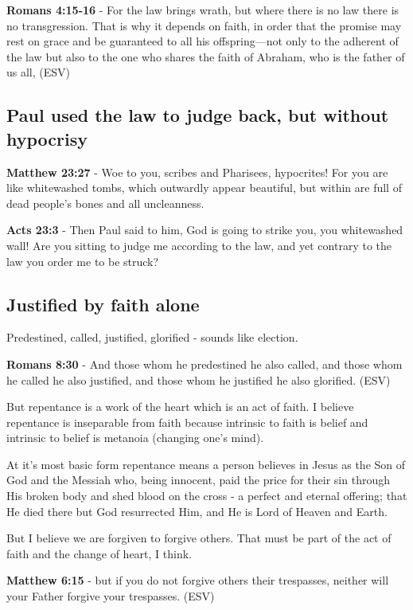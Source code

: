 \documentclass[11pt]{article}
\begin{document}
\textbf{Romans 4:15-16} - For the law brings wrath, but where there is no law there is no transgression. That is why it depends on faith, in order that the promise may rest on grace and be guaranteed to all his offspring—not only to the adherent of the law but also to the one who shares the faith of Abraham, who is the father of us all, (ESV)

\subsection{Paul used the law to judge back, but without hypocrisy}
\label{sec:org679f256}
\textbf{Matthew 23:27} - Woe to you, scribes and Pharisees, hypocrites! For you are like whitewashed tombs, which outwardly appear beautiful, but within are full of dead people's bones and all uncleanness.

\textbf{Acts 23:3} - Then Paul said to him, God is going to strike you, you whitewashed wall! Are you sitting to judge me according to the law, and yet contrary to the law you order me to be struck?

\subsection{Justified by faith alone}
\label{sec:org62fd5a4}
Predestined, called, justified, glorified - sounds like election.

\textbf{Romans 8:30} - And those whom he predestined he also called, and those whom he called he also justified, and those whom he justified he also glorified. (ESV)

But repentance is a work of the heart which is an act of faith.
I believe repentance is inseparable from faith because intrinsic to faith is belief and intrinsic to belief is metanoia (changing one's mind).

At it's most basic form repentance means a person believes in Jesus as the Son of God and the Messiah who, being innocent, paid the price for their sin through His broken body and shed blood on the cross - a perfect and eternal offering; that He died there but God resurrected Him, and He is Lord of Heaven and Earth.

But I believe we are forgiven to forgive others. That must be part of the act of faith and the change of heart, I think.

\textbf{Matthew 6:15} - but if you do not forgive others their trespasses, neither will your Father forgive your trespasses.  (ESV)
\end{document}
